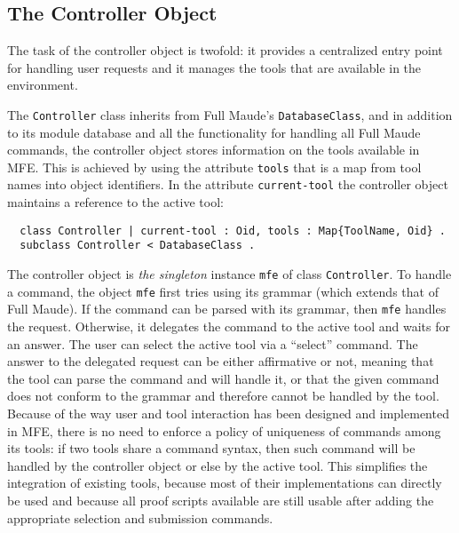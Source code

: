 
\subsection{The Controller Object}

The task of the controller object is twofold: it provides a centralized
entry point for handling user requests 
and it manages the tools that are available in the environment.

The \texttt{Controller} class inherits from Full Maude's \texttt{DatabaseClass}, 
and in addition to its module database and all the functionality for handling 
all Full Maude commands, the controller object stores information on
the tools available in MFE. This is achieved by using the attribute
{\tt tools} that is a map from tool names into object identifiers.
In the attribute {\tt current-tool} the controller object maintains a 
reference to the active tool:

\begin{small}
\begin{verbatim}
  class Controller | current-tool : Oid, tools : Map{ToolName, Oid} .
  subclass Controller < DatabaseClass .
\end{verbatim}
\end{small}
%
The controller object is {\em the singleton} instance {\tt mfe} of
class {\tt Controller}.
To handle a command, the object \texttt{mfe} first tries using its
grammar (which extends that of Full Maude). If the command
can be parsed with its grammar, then \texttt{mfe} handles
the request. Otherwise, it delegates the command to the 
active tool and waits for an answer.
The user can select the active tool via a ``select'' command.
The answer to the delegated request can be either affirmative or not,
meaning that the tool can parse the command and will
handle it, or that the given command does not conform to the grammar
and therefore cannot be handled by the tool.
Because of the way user and tool interaction has been designed and
implemented in MFE, there is no need to enforce a policy of
uniqueness of commands among its tools: if two tools share
a command syntax, then such command will be handled by the controller
object or else by the active tool. This simplifies the integration of
existing tools, because most of their implementations can directly be used 
and because all proof scripts available are still usable after adding 
the appropriate selection and submission commands. 

